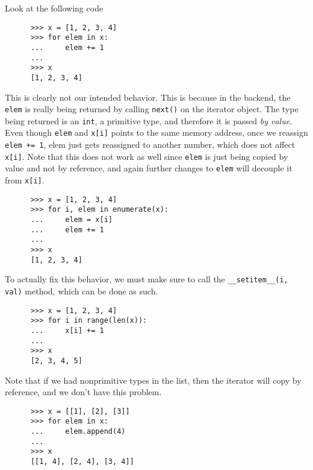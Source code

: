   \begin{example}
    Look at the following code 
    \begin{lstlisting}
      >>> x = [1, 2, 3, 4]
      >>> for elem in x: 
      ...     elem += 1 
      ... 
      >>> x
      [1, 2, 3, 4] 
    \end{lstlisting}
    This is clearly not our intended behavior. This is because in the backend, the \texttt{elem} is really being returned by calling \texttt{next()} on the iterator object. The type being returned is an \texttt{int}, a primitive type, and therefore it is passed \textit{by value}. Even though \texttt{elem} and \texttt{x[i]} points to the same memory address, once we reassign \texttt{elem += 1}, elem just gets reassigned to another number, which does not affect \texttt{x[i]}. Note that this does not work as well since \texttt{elem} is just being copied by value and not by reference, and again further changes to \texttt{elem} will decouple it from \texttt{x[i]}. 
    \begin{lstlisting}
      >>> x = [1, 2, 3, 4] 
      >>> for i, elem in enumerate(x): 
      ...     elem = x[i]
      ...     elem += 1
      ... 
      >>> x
      [1, 2, 3, 4] 
    \end{lstlisting}
    To actually fix this behavior, we must make sure to call the \texttt{\_\_setitem\_\_(i, val)} method, which can be done as such. 
    \begin{lstlisting}
      >>> x = [1, 2, 3, 4]
      >>> for i in range(len(x)): 
      ...     x[i] += 1 
      ... 
      >>> x
      [2, 3, 4, 5] 
    \end{lstlisting}
    Note that if we had nonprimitive types in the list, then the iterator will copy by reference, and we don't have this problem. 
    \begin{lstlisting}
      >>> x = [[1], [2], [3]]
      >>> for elem in x: 
      ...     elem.append(4)
      ... 
      >>> x
      [[1, 4], [2, 4], [3, 4]] 
    \end{lstlisting}
  \end{example}

